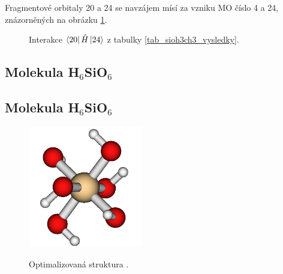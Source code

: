 \documentclass[
  digital, %
  table,   %
  lof,     %
  lot,     %
]{fithesis3}
\begin{document}
Fragmentové orbitaly  20 a 24 se navzájem mísí za vzniku MO číslo 4 a 24, znázorněných na obrázku \ref{obr_sioh3ch3_vysledky_IV}.   
\begin{figure}
\begin{center}
\caption{Interakce $\bra{20}{\hat{H}}\ket{24}$  z tabulky \ref{tab_sioh3ch3_vysledky}.}

\label{obr_sioh3ch3_vysledky_IV}\end{center}
\end{figure} 
  \subsection{Molekula H$_6$SiO$_6$}
   \subsection{Molekula H$_6$SiO$_6$}
 \begin{figure}[h!]
\caption{Optimalizovaná struktura . }
  \center
  \includegraphics[width=5cm]{obr_h6sio6.png}
  \label{obr_h6sio6_opt_struktura}
  \end{figure}
 
\end{document}
